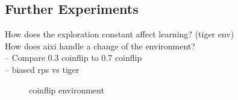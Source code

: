 \documentclass[paper=a4, fontsize=11pt]{scrartcl} %
\numberwithin{equation}{section} %
\numberwithin{figure}{section} %
\numberwithin{table}{section} %
\begin{document}
\subsection{Further Experiments}
How does the exploration constant affect learning? (tiger env)\\
How does aixi handle a change of the environment?\\
-- Compare 0.3 coinflip to 0.7 coinflip\\
-- biased rps vs tiger\\


\begin{figure}

\caption{\label{tab:setup}coinflip environment}
\end{figure}
\end{document}
